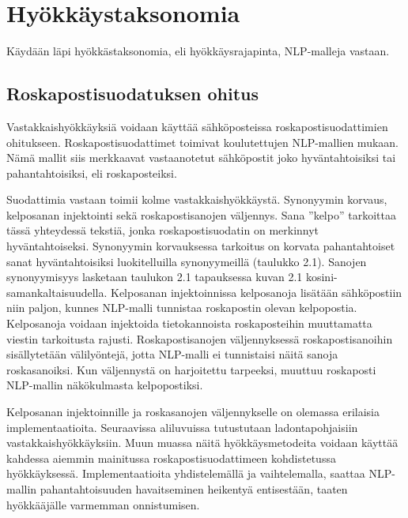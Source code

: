 \chapter{Hyökkäystaksonomia\label{methods}}
Käydään läpi hyökkästaksonomia, eli hyökkäysrajapinta, NLP-malleja vastaan.

\section{Roskapostisuodatuksen ohitus}
Vastakkaishyökkäyksiä voidaan käyttää sähköposteissa roskapostisuodattimien ohitukseen. Roskapostisuodattimet toimivat koulutettujen NLP-mallien mukaan. Nämä mallit siis merkkaavat vastaanotetut sähköpostit joko hyväntahtoisiksi tai pahantahtoisiksi, eli roskaposteiksi. \citep{spamfilter}

Suodattimia vastaan toimii kolme vastakkaishyökkäystä. Synonyymin korvaus, kelposanan injektointi sekä roskapostisanojen väljennys. Sana ''kelpo'' tarkoittaa tässä yhteydessä tekstiä, jonka roskapostisuodatin on merkinnyt hyväntahtoiseksi. Synonyymin korvauksessa tarkoitus on korvata pahantahtoiset sanat hyväntahtoisiksi luokitelluilla synonyymeillä (taulukko 2.1). Sanojen synonyymisyys lasketaan taulukon 2.1 tapauksessa kuvan 2.1 kosini-samankaltaisuudella. Kelposanan injektoinnissa kelposanoja lisätään sähköpostiin niin paljon, kunnes NLP-malli tunnistaa roskapostin olevan kelpopostia. Kelposanoja voidaan injektoida tietokannoista roskaposteihin muuttamatta viestin tarkoitusta rajusti. Roskapostisanojen väljennyksessä roskapostisanoihin sisällytetään välilyöntejä, jotta NLP-malli ei tunnistaisi näitä sanoja roskasanoiksi. Kun väljennystä on harjoitettu tarpeeksi, muuttuu roskaposti NLP-mallin näkökulmasta kelpopostiksi. \citep{spamfilter}

Kelposanan injektoinnille ja roskasanojen väljennykselle on olemassa erilaisia implementaatioita. Seuraavissa aliluvuissa tutustutaan ladontapohjaisiin vastakkaishyökkäyksiin. Muun muassa näitä hyökkäysmetodeita voidaan käyttää kahdessa aiemmin mainitussa roskapostisuodattimeen kohdistetussa hyökkäyksessä. Implementaatioita yhdistelemällä ja vaihtelemalla, saattaa NLP-mallin pahantahtoisuuden havaitseminen heikentyä entisestään, taaten hyökkääjälle varmemman onnistumisen.

